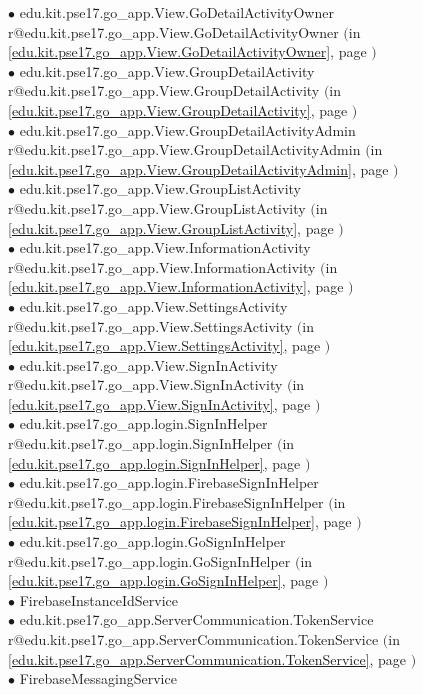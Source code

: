 \documentclass[11pt,a4paper]{report}
\makeatletter
\newcommand{\refdefined}[1]{
\expandafter\ifx\csname r@#1\endcsname\relax
\relax\else
{$($in \ref{#1}, page \pageref{#1}$)$}\fi}
\makeatother
\begin{document}
{{{\hspace{4.0cm} $\bullet$ edu.kit.pse17.go\_app.View.GoDetailActivityOwner {\tiny \refdefined{edu.kit.pse17.go_app.View.GoDetailActivityOwner}} \\
\hspace{3.0cm} $\bullet$ edu.kit.pse17.go\_app.View.GroupDetailActivity {\tiny \refdefined{edu.kit.pse17.go_app.View.GroupDetailActivity}} \\
\hspace{4.0cm} $\bullet$ edu.kit.pse17.go\_app.View.GroupDetailActivityAdmin {\tiny \refdefined{edu.kit.pse17.go_app.View.GroupDetailActivityAdmin}} \\
\hspace{3.0cm} $\bullet$ edu.kit.pse17.go\_app.View.GroupListActivity {\tiny \refdefined{edu.kit.pse17.go_app.View.GroupListActivity}} \\
\hspace{3.0cm} $\bullet$ edu.kit.pse17.go\_app.View.InformationActivity {\tiny \refdefined{edu.kit.pse17.go_app.View.InformationActivity}} \\
\hspace{3.0cm} $\bullet$ edu.kit.pse17.go\_app.View.SettingsActivity {\tiny \refdefined{edu.kit.pse17.go_app.View.SettingsActivity}} \\
\hspace{3.0cm} $\bullet$ edu.kit.pse17.go\_app.View.SignInActivity {\tiny \refdefined{edu.kit.pse17.go_app.View.SignInActivity}} \\
\hspace{2.0cm} $\bullet$ edu.kit.pse17.go\_app.login.SignInHelper {\tiny \refdefined{edu.kit.pse17.go_app.login.SignInHelper}} \\
\hspace{3.0cm} $\bullet$ edu.kit.pse17.go\_app.login.FirebaseSignInHelper {\tiny \refdefined{edu.kit.pse17.go_app.login.FirebaseSignInHelper}} \\
\hspace{3.0cm} $\bullet$ edu.kit.pse17.go\_app.login.GoSignInHelper {\tiny \refdefined{edu.kit.pse17.go_app.login.GoSignInHelper}} \\
\hspace{1.0cm} $\bullet$ FirebaseInstanceIdService {\tiny } \\
\hspace{2.0cm} $\bullet$ edu.kit.pse17.go\_app.ServerCommunication.TokenService {\tiny \refdefined{edu.kit.pse17.go_app.ServerCommunication.TokenService}} \\
\hspace{1.0cm} $\bullet$ FirebaseMessagingService {\tiny } \\
}}}
\end{document}
